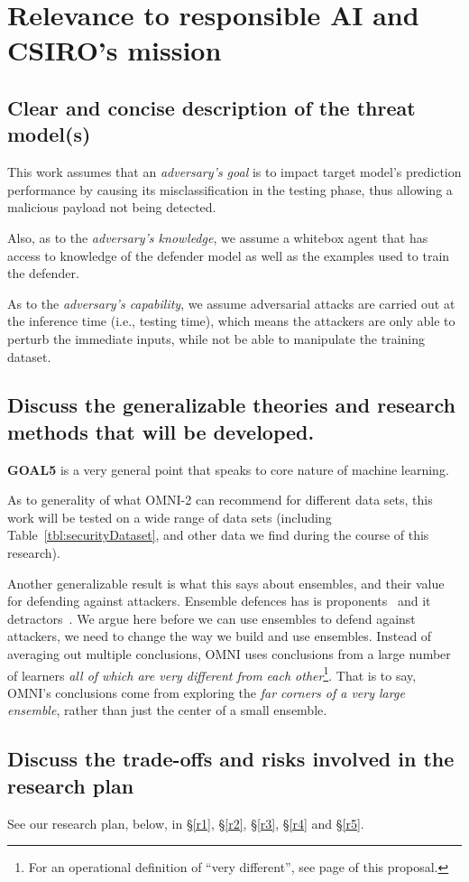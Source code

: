 
\section{
Relevance to responsible AI and CSIRO's mission} 
\subsection{Clear and concise description of the threat model(s)}
\bi
\item
This work assumes that an {\em adversary's goal} is to impact target model’s prediction performance by causing its misclassification in the testing phase, thus 
allowing a malicious payload not being detected.
\item
Also, as to the {\em adversary's knowledge},
we assume a whitebox agent that has access to      knowledge of the defender model as well
as the examples used to train the defender. 
\item
As to the 
{\em adversary’s capability},  we assume adversarial attacks are carried out at the inference time (i.e., testing time), which means the attackers are only able to perturb the immediate inputs, while not be able to manipulate the training dataset. 
\ei
\subsection{Discuss the generalizable theories and research methods that will be developed.} {\bf GOAL5} is
a very general point that speaks to core nature of machine learning.

As to generality of what OMNI-2 can recommend for different data sets, this work will be tested
on a wide range of data sets (including Table~\ref{tbl:securityDataset}, and  other data we   find 
during the course of this research).


Another generalizable result is what this says about  
 ensembles, and their value for  defending against attackers. Ensemble defences has is proponents~\cite{kariyappa2019improving,biggio2010multiple,DBLP:conf/iclr/TramerKPGBM18,smutz2016tree,kantchelian2016evasion} and it detractors~\cite{zhang2020decision,zhang2018gradient,he2017adversarial,DBLP:conf/iclr/TramerKPGBM18,DBLP:journals/corr/PapernotMG16}. 
 We argue here before we can use ensembles to defend against attackers, we need to change the way we build and use ensembles.  
Instead of averaging out multiple conclusions, OMNI  uses conclusions
from a large number of learners {\em all of which are  very
different from each other}\footnote{For an operational definition of ``very different'', see page \pageref{definititions}
of this proposal.}.
That is to say, 
 OMNI's conclusions come from exploring the 
 {\em far corners of a very large ensemble}, rather than just the center
of a   small ensemble. 

\subsection{Discuss the trade-offs and risks involved in the research plan}
See our research plan, below, in
\S\ref{r1}, \S\ref{r2}, \S\ref{r3}, \S\ref{r4} and \S\ref{r5}.
